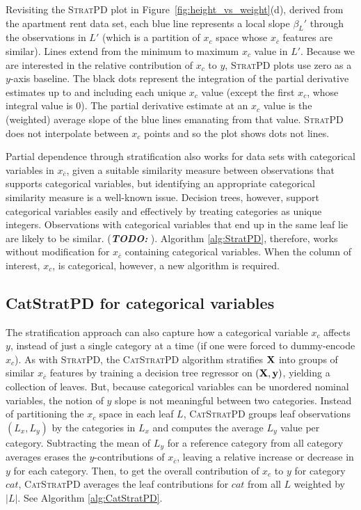 \documentclass[12pt]{article}
\newcommand{\figref}[1]{Figure~\ref{#1}}
\newcommand{\todo}[1]{{\bf\em TODO:} {{\color{red}{#1}}}}
\newcommand{\spd}{\fontfamily{cmr}\textsc{\small StratPD}}
\newcommand{\cspd}{\fontfamily{cmr}\textsc{\small CatStratPD}}
\newcommand{\xnc}{$x_{\overline{c}}$}
\begin{document}
Revisiting the \spd{} plot in \figref{fig:height_vs_weight}(d), derived from the apartment rent data set, each blue line represents a local slope $\beta_L'$ through the observations in $L'$ (which is a partition of $x_c$ space whose \xnc{} features are similar). Lines extend from the minimum to maximum $x_c$ value in $L'$.  Because we are interested in the relative contribution of $x_c$ to $y$, \spd{} plots use zero as a $y$-axis baseline. The black dots represent the integration of the partial derivative estimates up to and including each unique $x_c$ value (except the first $x_c$, whose integral value is 0). The partial derivative estimate at an $x_c$ value is the (weighted) average slope of the blue lines emanating from that value. \spd{} does not interpolate between $x_c$ points and so the plot shows dots not lines. 

Partial dependence through stratification also works for data sets with categorical variables in \xnc{}, given a suitable similarity measure between observations that supports categorical variables, but identifying an appropriate categorical similarity measure is a well-known issue.  Decision trees, however, support categorical variables easily and effectively by treating categories as unique integers. Observations with categorical variables that end up in the same leaf lie are likely to be similar. (\todo{cite breiman proximity matrix and p595 of ESL book}). Algorithm \ref{alg:StratPD}, therefore, works without modification for \xnc{} containing categorical variables. When the column of interest, $x_c$, is categorical, however, a new algorithm is required.

\subsection{CatStratPD for categorical variables}

The stratification approach can also capture how a categorical variable $x_c$ affects $y$, instead of just a single category at a time (if one were forced to dummy-encode $x_c$). As with \spd{}, the \cspd{} algorithm stratifies $\bf X$ into groups of similar \xnc{} features by training a decision tree regressor on $({\bf X}, {\bf y})$, yielding a collection of leaves. But, because categorical variables can be unordered nominal variables, the notion of $y$ slope is not meaningful between two categories. Instead of partitioning the $x_c$ space in each leaf $L$, \cspd{} groups leaf observations $(L_x, L_y)$ by the categories in $L_x$ and computes the average $L_y$ value per category.  Subtracting the mean of $L_y$ for a reference category from all category averages erases the $y$-contributions of \xnc{}, leaving a relative increase or decrease in $y$  for each category. Then, to get the overall contribution of $x_c$ to $y$ for category $cat$, \cspd{} averages the leaf contributions for $cat$ from all $L$ weighted by $|L|$. See Algorithm \ref{alg:CatStratPD}.
\end{document}

